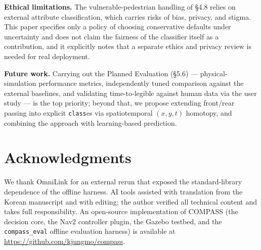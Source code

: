 \documentclass[11pt]{article}
\newcommand{\Class}{\texttt{class}}
\newcommand{\code}[1]{\texttt{#1}}
\begin{document}
\textbf{Ethical limitations.} The vulnerable-pedestrian handling of \S4.8 relies on external attribute classification, which carries risks of bias, privacy, and stigma. This paper specifies only a policy of choosing conservative defaults under uncertainty and does not claim the fairness of the classifier itself as a contribution, and it explicitly notes that a separate ethics and privacy review is needed for real deployment.

\textbf{Future work.} Carrying out the Planned Evaluation (\S5.6) --- physical-simulation performance metrics, independently tuned comparison against the external baselines, and validating time-to-legible against human data via the user study --- is the top priority; beyond that, we propose extending front/rear passing into explicit \Class{es} via spatiotemporal $(x,y,t)$ homotopy, and combining the approach with learning-based prediction.

\section*{Acknowledgments}

We thank OmniLink for an external rerun that exposed the standard-library dependence of the offline harness. AI tools assisted with translation from the Korean manuscript and with editing; the author verified all technical content and takes full responsibility. An open-source implementation of COMPASS (the decision core, the Nav2 controller plugin, the Gazebo testbed, and the \code{compass\_eval} offline evaluation harness) is available at \url{https://github.com/kjungmo/compass}.
\end{document}
